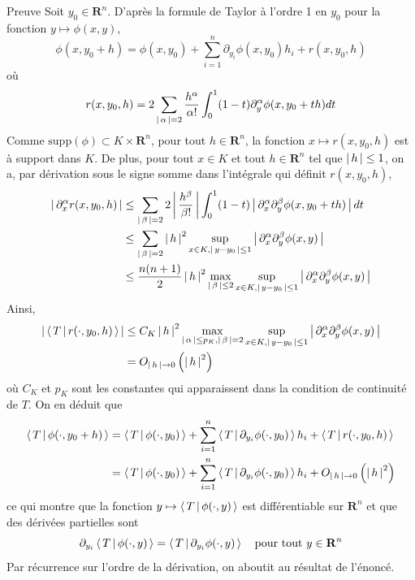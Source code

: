         \begin{demo}{Preuve}
            Soit $y_0 \in \mathbf{R}^n$. D’après la formule de Taylor à l’ordre 1 en $y_0$ pour la fonction $y \mapsto \phi(x,y)$, 
            \[ \phi(x,y_0 + h) = \phi(x,y_0) + \sum_{i=1}^{n} \partial_{y_i} \phi(x,y_0) h_i + r(x,y_0,h) \]    
            où 
            \[ r(x,y_0,h)= 2 \sum_{\left\lvert \, \alpha \, \right\rvert = 2} \frac{h^{\alpha}}{\alpha!} \int_{0}^{1} (1-t)\partial_y^{\alpha} \phi(x, y_0 + th) dt \]   
            Comme $\text{supp}(\phi) \subset K \times \mathbf{R}^n$, pour tout $h \in \mathbf{R}^n$, la fonction $x \mapsto r(x,y_0,h)$ est à support dans $K$. De plus, pour tout $x \in K$ et tout $h \in \mathbf{R}^n$ tel que $\left\lvert \, h \, \right\rvert \leq 1$, on a, par dérivation sous le signe somme dans l’intégrale qui définit $r(x,y_0,h)$, 
            \begin{align*}
                \left\lvert \, \partial_x^{\alpha} r(x,y_0,h) \, \right\rvert  
                &\leq \sum_{\left\lvert \, \beta \, \right\rvert = 2} 2 \left\lvert \, \frac{h^\beta}{\beta!} \, \right\rvert \int_{0}^1 (1 - t) \left\lvert \, \partial_x^{\alpha} \partial_y^{\beta} \phi(x,y_0 + th) \, \right\rvert dt \\
                &\leq \sum_{\left\lvert \, \beta \, \right\rvert = 2} \left\lvert \, h \, \right\rvert^2 \sup_{x \in K, \left\lvert \, y - y_0 \, \right\rvert \leq 1} \left\lvert \, \partial_x^{\alpha} \partial_y^{\beta} \phi(x,y) \, \right\rvert \\
                &\leq \frac{n(n+1)}{2}\left\lvert \, h \, \right\rvert^2 \max_{\left\lvert \, \beta \, \right\rvert \leq 2} \sup_{x \in K, \left\lvert \, y - y_0 \, \right\rvert \leq 1} \left\lvert \, \partial_x^{\alpha} \partial_y^{\beta} \phi(x,y) \, \right\rvert \\
            \end{align*}
            Ainsi, 
            \begin{align*}
                \left\lvert \, \left< \, T \, \middle| \, r(\cdot,y_0, h) \, \right> \, \right\rvert 
                &\leq C_K \left\lvert \, h \, \right\rvert^2 \max_{\left\lvert \, \alpha \, \right\rvert \leq p_K, \left\lvert \, \beta \, \right\rvert = 2} \sup_{x \in K, \left\lvert \, y - y_0 \, \right\rvert \leq 1} \left\lvert \, \partial_x^{\alpha} \partial_y^{\beta} \phi(x,y) \, \right\rvert \\
                &= O_{\left\lvert \, h \, \right\rvert \to 0} \left(\left\lvert \, h \, \right\rvert^2\right) 
            \end{align*}
            où $C_K$ et $p_K$ sont les constantes qui apparaissent dans la condition de continuité de $T$. On en déduit que 
            \begin{align*}
                \left< \, T \, \middle| \, \phi(\cdot, y_0 + h) \, \right> 
                &= \left< \, T \, \middle| \, \phi(\cdot, y_0) \, \right> + \sum_{i=1}^{n} \left< \, T \, \middle| \, \partial_{y_i} \phi(\cdot, y_0) \, \right> h_i + \left< \, T \, \middle| \, r(\cdot, y_0, h) \, \right> \\
                &= \left< \, T \, \middle| \, \phi(\cdot, y_0) \, \right> + \sum_{i=1}^{n} \left< \, T \, \middle| \, \partial_{y_i} \phi(\cdot, y_0) \, \right> h_i + O_{\left\lvert \, h \, \right\rvert \to 0} \left(\left\lvert \, h \, \right\rvert^2\right)
            \end{align*}
            ce qui montre que la fonction $y \mapsto \left< \, T \, \middle| \, \phi(\cdot, y) \, \right>$ est différentiable sur $\mathbf{R}^n$ et que des dérivées partielles sont 
            \[ \partial_{y_i} \left< \, T \, \middle| \, \phi(\cdot, y) \, \right> = \left< \, T \, \middle| \, \partial_{y_i} \phi(\cdot, y) \, \right> \quad \text{pour tout } y \in \mathbf{R}^n \]   
            Par récurrence sur l’ordre de la dérivation, on aboutit au résultat de l’énoncé.
        \end{demo}

